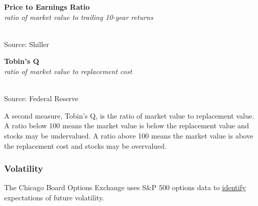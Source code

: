 \documentclass{report}
\makeatletter
\newcommand{\tbllink}[1]{\href{https://raw.githubusercontent.com/bdecon/US-chartbook/master/chartbook/data/#1}{\faTable}}
\newcommand*\short[1]{\expandafter\@gobbletwo\number\numexpr#1\relax}
\newcommand{\shdateaxisticks}{
		date coordinates in=x, axis line style={draw=none},
		xmax={2023-10-01},
		max space between ticks=40,	    
		xtick={{1990-01-01}, {1995-01-01}, {2000-01-01}, 
			{2005-01-01}, {2010-01-01}, {2015-01-01}, {2020-01-01}},
		minor xtick={},
		enlarge y limits={0.06}, enlarge x limits={0.01},
		}
\newcommand{\bbar}[2]{extra #1 ticks = {{#2}}, extra #1 tick labels = ,
		extra #1 tick style = {grid=major, grid style={thick, black!25}},}
\newcommand{\stdline}[4]{\addplot[very thick, no markers, color=#1] 
		table [x=#2, y=#3, col sep=comma] {#4};	}
\newcommand{\rbars}{
		\fill[color=black!10] (axis cs:{1990-07-01},\pgfkeysvalueof{/pgfplots/ymin}) rectangle 
			(axis cs:{1991-03-01}, \pgfkeysvalueof{/pgfplots/ymax});
		\fill[color=black!10] (axis cs:{2007-12-01},\pgfkeysvalueof{/pgfplots/ymin}) rectangle 
			(axis cs:{2009-07-01}, \pgfkeysvalueof{/pgfplots/ymax});
		\fill[color=black!10] (axis cs:{2001-03-01},\pgfkeysvalueof{/pgfplots/ymin}) rectangle 
			(axis cs:{2001-11-01}, \pgfkeysvalueof{/pgfplots/ymax});
		\fill[color=black!10] (axis cs:{2020-02-01},\pgfkeysvalueof{/pgfplots/ymin}) rectangle 
			(axis cs:{2020-05-01}, \pgfkeysvalueof{/pgfplots/ymax});}
\makeatother
\begin{document}
{\begin{minipage}{0.76\textwidth}
\begin{minipage}{0.46\textwidth}
\normalsize \textbf{Price to Earnings Ratio}\\
\footnotesize{\textit{ratio of market value to trailing 10-year returns}}\\
\hspace*{-2mm} \\
\footnotesize{Source: Shiller} \hfill \tbllink{catrpe.csv}
\end{minipage} \hfill
\begin{minipage}{0.46\textwidth} 
\normalsize \textbf{Tobin's Q}\\
\footnotesize{\textit{ratio of market value to replacement cost}}\\
\hspace*{-2mm} \\
\footnotesize{Source: Federal Reserve} \hfill \tbllink{tobinq.csv}
\end{minipage}
\vspace{1mm}

\small A second measure, Tobin's Q, is the ratio of market value to replacement value. A ratio below 100 means the market value is below the replacement value and stocks may be undervalued. A ratio above 100 means the market value is above the replacement cost and stocks may be overvalued.  

\subsubsection*{Volatility}  
\small The Chicago Board Options Exchange uses S\&P 500 options data to \href{http://www.cboe.com/vix}{identify} expectations of future volatility. 
\vspace{1mm}


\end{minipage}}
\end{document}
